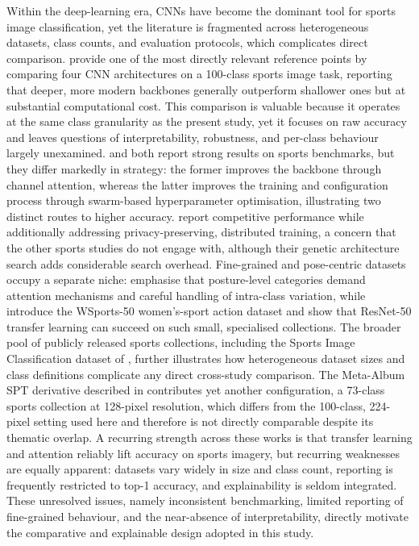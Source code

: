 Within the deep-learning era, CNNs have become the dominant tool for sports image classification, yet the literature is fragmented across heterogeneous datasets, class counts, and evaluation protocols, which complicates direct comparison.
\citet{liu2024comparison} provide one of the most directly relevant reference points by comparing four CNN architectures on a 100-class sports image task, reporting that deeper, more modern backbones generally outperform shallower ones but at substantial computational cost.
This comparison is valuable because it operates at the same class granularity as the present study, yet it focuses on raw accuracy and leaves questions of interpretability, robustness, and per-class behaviour largely unexamined.
\citet{li2024seres} and \citet{zhou2024tuna} both report strong results on sports benchmarks, but they differ markedly in strategy: the former improves the backbone through channel attention, whereas the latter improves the training and configuration process through swarm-based hyperparameter optimisation, illustrating two distinct routes to higher accuracy.
\citet{fu2024federated} report competitive performance while additionally addressing privacy-preserving, distributed training, a concern that the other sports studies do not engage with, although their genetic architecture search adds considerable search overhead.
Fine-grained and pose-centric datasets occupy a separate niche: \citet{bera2023finegrained} emphasise that posture-level categories demand attention mechanisms and careful handling of intra-class variation, while \citet{ray2024wsports} introduce the WSports-50 women's-sport action dataset and \citet{ray2025womensports} show that ResNet-50 transfer learning can succeed on such small, specialised collections.
The broader pool of publicly released sports collections, including the Sports Image Classification dataset of \citet{harkal2023sports}, further illustrates how heterogeneous dataset sizes and class definitions complicate any direct cross-study comparison.
The Meta-Album SPT derivative described in \citet{metaalbum2022spt} contributes yet another configuration, a 73-class sports collection at 128-pixel resolution, which differs from the 100-class, 224-pixel setting used here and therefore is not directly comparable despite its thematic overlap.
A recurring strength across these works is that transfer learning and attention reliably lift accuracy on sports imagery, but recurring weaknesses are equally apparent: datasets vary widely in size and class count, reporting is frequently restricted to top-1 accuracy, and explainability is seldom integrated.
These unresolved issues, namely inconsistent benchmarking, limited reporting of fine-grained behaviour, and the near-absence of interpretability, directly motivate the comparative and explainable design adopted in this study.

